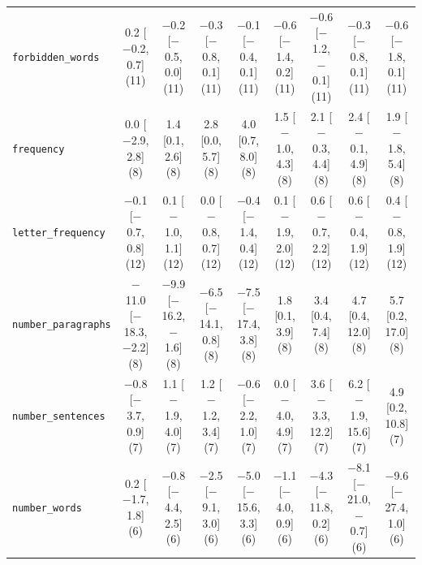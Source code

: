 \begin{table}[h]
{\begin{tabular}{lcccccccc}
\texttt{forbidden\_words} & 0.2 [$-$0.2, 0.7] (11) & $-$0.2 [$-$0.5, 0.0] (11) & $-$0.3 [$-$0.8, 0.1] (11) & $-$0.1 [$-$0.4, 0.1] (11) & $-$0.6 [$-$1.4, 0.2] (11) & $-$0.6 [$-$1.2, $-$0.1] (11) & $-$0.3 [$-$0.8, 0.1] (11) & $-$0.6 [$-$1.8, 0.1] (11) \\
\texttt{frequency} & 0.0 [$-$2.9, 2.8] (8) & 1.4 [0.1, 2.6] (8) & 2.8 [0.0, 5.7] (8) & 4.0 [0.7, 8.0] (8) & 1.5 [$-$1.0, 4.3] (8) & 2.1 [$-$0.3, 4.4] (8) & 2.4 [$-$0.1, 4.9] (8) & 1.9 [$-$1.8, 5.4] (8) \\
\texttt{letter\_frequency} & $-$0.1 [$-$0.7, 0.8] (12) & 0.1 [$-$1.0, 1.1] (12) & 0.0 [$-$0.8, 0.7] (12) & $-$0.4 [$-$1.4, 0.4] (12) & 0.1 [$-$1.9, 2.0] (12) & 0.6 [$-$0.7, 2.2] (12) & 0.6 [$-$0.4, 1.9] (12) & 0.4 [$-$0.8, 1.9] (12) \\
\texttt{number\_paragraphs} & $-$11.0 [$-$18.3, $-$2.2] (8) & $-$9.9 [$-$16.2, $-$1.6] (8) & $-$6.5 [$-$14.1, 0.8] (8) & $-$7.5 [$-$17.4, 3.8] (8) & 1.8 [0.1, 3.9] (8) & 3.4 [0.4, 7.4] (8) & 4.7 [0.4, 12.0] (8) & 5.7 [0.2, 17.0] (8) \\
\texttt{number\_sentences} & $-$0.8 [$-$3.7, 0.9] (7) & 1.1 [$-$1.9, 4.0] (7) & 1.2 [$-$1.2, 3.4] (7) & $-$0.6 [$-$2.2, 1.0] (7) & 0.0 [$-$4.0, 4.9] (7) & 3.6 [$-$3.3, 12.2] (7) & 6.2 [$-$1.9, 15.6] (7) & 4.9 [0.2, 10.8] (7) \\
\texttt{number\_words} & 0.2 [$-$1.7, 1.8] (6) & $-$0.8 [$-$4.4, 2.5] (6) & $-$2.5 [$-$9.1, 3.0] (6) & $-$5.0 [$-$15.6, 3.3] (6) & $-$1.1 [$-$4.0, 0.9] (6) & $-$4.3 [$-$11.8, 0.2] (6) & $-$8.1 [$-$21.0, $-$0.7] (6) & $-$9.6 [$-$27.4, 1.0] (6) \\
\bottomrule
\end{tabular}
}
\end{table}

